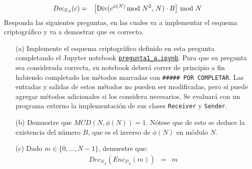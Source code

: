 \documentclass[11pt]{article}
\newcommand{\Enc}{\textit{Enc}}
\newcommand{\Dec}{\textit{Dec}}
\newcommand{\MCD}{\textit{MCD}}
\begin{document}
  \begin{eqnarray*}
    \Dec_{S_A}(c) &=&   \big[\dv(c^{\phi(N)} \!\!\!\mod N^2,\, N)  \cdot B \big] \!\!\mod N
  \end{eqnarray*}
  Responda las siguientes preguntas, en las cuales va a implementar el esquema criptográfico y va a demostrar que es correcto.
    \begin{enumerate}
\item[(a)] Implemente el esquema criptográfico definido en esta pregunta
  completando el Jupyter notebook
  \href{https://github.com/IIC3253/2023/blob/main/tareas/tarea\%202/enunciado/questions/p1/pregunta1_a.ipynb}{\texttt{pregunta1\_a.ipynb}}. Para
  que su pregunta sea considerada correcta, su notebook deberá correr
  de principio a fin habiendo completado los métodos marcadas con
  \texttt{\#\#\#\#\# POR COMPLETAR}. Las entradas y salidas de estos
  métodos no pueden ser modificadas, pero sí puede agregar métodos
  adicionales si los considera necesarios. Se
  evaluará con un programa externo la implementación de sus clases
  \texttt{Receiver} y \texttt{Sender}.
  
  \item[(b)] Demuestre que $\MCD(N, \phi(N)) = 1$. Nótese que de esto
    se deduce la existencia del número $B$, que es el inverso
    de $\phi(N)$ en módulo $N$.

\item[(c)] Dado     $m \in \{0, \ldots, N-1\}$, demuestre que:
  \begin{eqnarray*}
    \Dec_{S_A}(\Enc_{P_A}(m)) &=& m
  \end{eqnarray*}
  \end{enumerate}

\bigskip
\end{document}
